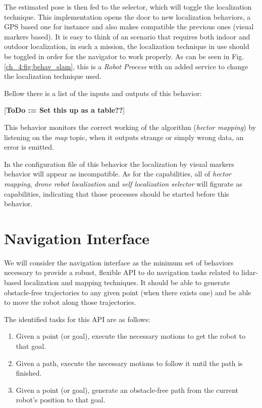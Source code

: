   The estimated pose is then fed to the selector, which will toggle the localization technique. This implementation opens the door to new localization behaviors, a GPS based one for instance and also makes compatible the previous ones (visual markers based). It is easy to think of an scenario that requires both indoor and outdoor localization, in such a mission, the localization technique in use should be toggled in order for the navigator to work properly. As can be seen in Fig. \ref{ch_4:fig:behav_slam}, this is a \textit{Robot Process} with an added service to change the localization technique used.

  Bellow there is a list of the inputs and outputs of this behavior:

  [\textbf{ToDo := Set this up as a table??}]
  

  This behavior monitors the correct working of the algorithm (\textit{hector mapping}) by listening on the \textit{map} topic, when it outputs strange or simply wrong data, an error is emitted.

  In the configuration file of this behavior the localization by visual markers behavior will appear as incompatible. As for the capabilities, all of \textit{hector mapping}, \textit{drone robot localization} and \textit{self localization selector} will figurate as capabilities, indicating that those processes should be started before this behavior.

\section{Navigation Interface} \label{ch_4:sect:nav_interface}

  We will consider the navigation interface as the minimum set of behaviors necessary to provide a robust, flexible API to do navigation tasks related to lidar-based localization and mapping techniques. It should be able to generate obstacle-free trajectories  to any given point (when there exists one) and be able to move the robot along those trajectories.

  The identified tasks for this API are as follows:

  \begin{enumerate}
    \item Given a point (or goal), execute the necessary motions to get the robot to that goal.
    \item Given a path, execute the necessary motions to follow it until the path is finished.
    \item Given a point (or goal), generate an obstacle-free path from the current robot's position to that goal.
  \end{enumerate}

